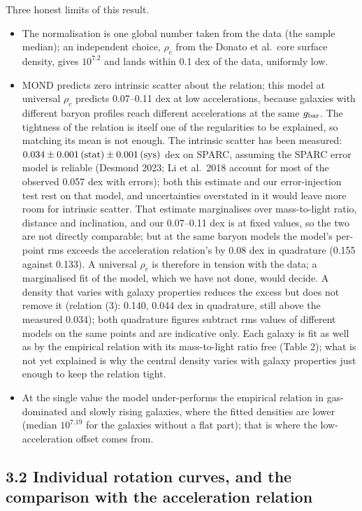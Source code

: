 \documentclass[
  10pt,
]{article}
\begin{document}
Three honest limits of this result.
\begin{itemize}
\item[(i)] The normalisation is one global number taken from the data (the sample median); an independent choice, $\rho_c$ from the Donato et al.~core surface density, gives $10^{7.2}$ and lands within 0.1 dex of the data, uniformly low.
\item[(ii)] MOND predicts zero intrinsic scatter about the relation; this model at universal $\rho_c$ predicts 0.07--0.11 dex at low accelerations, because galaxies with different baryon profiles reach different accelerations at the same $g_{\rm bar}$. The tightness of the relation is itself one of the regularities to be explained, so matching its mean is not enough. The intrinsic scatter has been measured: $0.034\pm0.001\,{\rm(stat)}\pm0.001\,{\rm(sys)}$ dex on SPARC, assuming the SPARC error model is reliable (Desmond 2023; Li et al.~2018 account for most of the observed 0.057 dex with errors); both this estimate and our error-injection test rest on that model, and uncertainties overstated in it would leave more room for intrinsic scatter. That estimate marginalises over mass-to-light ratio, distance and inclination, and our 0.07--0.11 dex is at fixed values, so the two are not directly comparable; but at the same baryon models the model's per-point rms exceeds the acceleration relation's by 0.08 dex in quadrature (0.155 against 0.133). A universal $\rho_c$ is therefore in tension with the data; a marginalised fit of the model, which we have not done, would decide. A density that varies with galaxy properties reduces the excess but does not remove it (relation (3): 0.140, 0.044 dex in quadrature, still above the measured 0.034); both quadrature figures subtract rms values of different models on the same points and are indicative only. Each galaxy is fit as well as by the empirical relation with its mass-to-light ratio free (Table 2); what is not yet explained is why the central density varies with galaxy properties just enough to keep the relation tight.
\item[(iii)] At the single value the model under-performs the empirical relation in gas-dominated and slowly rising galaxies, where the fitted densities are lower (median $10^{7.19}$ for the galaxies without a flat part); that is where the low-acceleration offset comes from.
\end{itemize}


\subsection{3.2 Individual rotation curves, and the comparison with the acceleration relation}\label{individual-rotation-curves-and-the-comparison-with-the-acceleration-relation}
\end{document}
